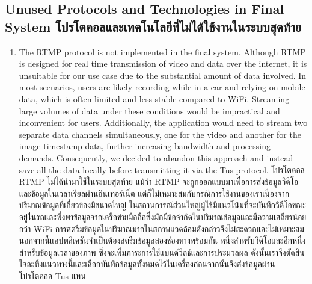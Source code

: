 \subsection{\ifenglish Unused Protocols and Technologies in Final System \else โปรโตคอลและเทคโนโลยีที่ไม่ได้ใช้งานในระบบสุดท้าย \fi}

\begin{enumerate}
    \item \ifenglish 
    The RTMP protocol is not implemented in the final system. Although RTMP is designed for real time transmission of video and data over the internet, it is unsuitable for our use case due to the substantial amount of data involved. In most scenarios, users are likely recording while in a car and relying on mobile data, which is often limited and less stable compared to WiFi. Streaming large volumes of data under these conditions would be impractical and inconvenient for users. Additionally, the application would need to stream two separate data channels simultaneously, one for the video and another for the image timestamp data, further increasing bandwidth and processing demands. Consequently, we decided to abandon this approach and instead save all the data locally before transmitting it via the Tus protocol.
    \else 
    โปรโตคอล RTMP ไม่ได้นำมาใช้ในระบบสุดท้าย แม้ว่า RTMP จะถูกออกแบบมาเพื่อการส่งข้อมูลวิดีโอและข้อมูลในเวลาเรียลผ่านอินเทอร์เน็ต แต่ก็ไม่เหมาะสมกับกรณีการใช้งานของเราเนื่องจากปริมาณข้อมูลที่เกี่ยวข้องมีขนาดใหญ่ ในสถานการณ์ส่วนใหญ่ผู้ใช้มีแนวโน้มที่จะบันทึกวิดีโอขณะอยู่ในรถและพึ่งพาข้อมูลจากเครือข่ายมือถือซึ่งมักมีข้อจำกัดในปริมาณข้อมูลและมีความเสถียรน้อยกว่า WiFi การสตรีมข้อมูลในปริมาณมากในสภาพแวดล้อมดังกล่าวจึงไม่สะดวกและไม่เหมาะสม นอกจากนี้แอปพลิเคชันจำเป็นต้องสตรีมข้อมูลสองช่องทางพร้อมกัน หนึ่งสำหรับวิดีโอและอีกหนึ่งสำหรับข้อมูลเวลาของภาพ ซึ่งจะเพิ่มภาระการใช้แบนด์วิดธ์และการประมวลผล ดังนั้นเราจึงตัดสินใจละทิ้งแนวทางนี้และเลือกบันทึกข้อมูลทั้งหมดไว้ในเครื่องก่อนจากนั้นจึงส่งข้อมูลผ่านโปรโตคอล Tus แทน
    \fi
\end{enumerate}
